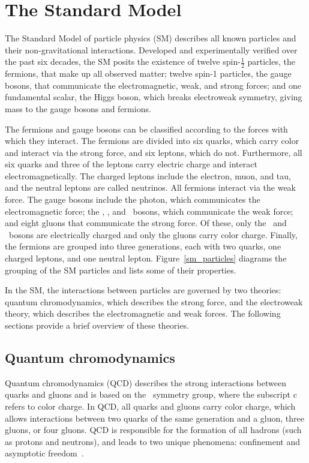 \section{The Standard Model}
The Standard Model of particle physics (SM) describes all known particles and their non-gravitational interactions. Developed and experimentally verified over the past six decades, the SM posits the existence of twelve spin-$\frac{1}{2}$ particles, the fermions, that make up all observed matter; twelve spin-1 particles, the gauge bosons, that communicate the electromagnetic, weak, and strong forces; and one fundamental scalar, the Higgs boson, which breaks electroweak symmetry, giving mass to the gauge bosons and fermions.

The fermions and gauge bosons can be classified according to the forces with which they interact. The fermions are divided into six quarks, which carry color and interact via the strong force, and six leptons, which do not. Furthermore, all six quarks and three of the leptons carry electric charge and interact electromagnetically. The charged leptons include the electron, muon, and tau, and the neutral leptons are called neutrinos. All fermions interact via the weak force. The gauge bosons include the photon, which communicates the electromagnetic force; the \PWp, \PWm, and \cPZ\ bosons, which communicate the weak force; and eight gluons that communicate the strong force. Of these, only the \PWp\ and \PWm\ bosons are electrically charged and only the gluons carry color charge. Finally, the fermions are grouped into three generations, each with two quarks, one charged leptons, and one neutral lepton. Figure~\ref{sm_particles} diagrams the grouping of the SM particles and lists some of their properties.



In the SM, the interactions between particles are governed by two theories: quantum chromodynamics, which describes the strong force, and the electroweak theory, which describes the electromagnetic and weak forces. The following sections provide a brief overview of these theories.

\subsection{Quantum chromodynamics}
Quantum chromodynamics (QCD) describes the strong interactions between \linebreak[4]quarks and gluons and is based on the \suthreec\ symmetry group, where the subscript $\mathrm{c}$ refers to color charge. In QCD, all quarks and gluons carry color charge, which allows interactions between two quarks of the same generation and a gluon, three gluons, or four gluons. QCD is responsible for the formation of all hadrons (such as protons and neutrons), and leads to two unique phenomena: confinement and asymptotic freedom~\cite{gross_wilczek_73, qcd_73}.

